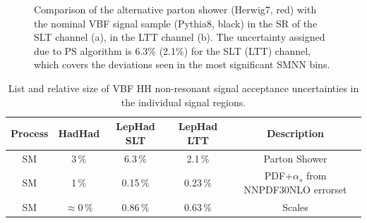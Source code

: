 \begin{figure}[htbp]
  \centering


  \caption{Comparison of the alternative parton shower (Herwig7, red)
    with the nominal VBF signal sample (Pythia8, black) in the SR of
    the \lephad SLT channel (a), in the LTT channel (b). The uncertainty assigned due to PS algorithm is
    6.3\% (2.1\%) for the SLT (LTT) channel, which covers the deviations seen in
    the most significant SMNN bins.}
\label{fig:lephad_vbf_ps}
\end{figure}



\begin{table}
\centering
\small
\begin{tabular}{|c|c|c|c|c|}
\hline
Process & HadHad & LepHad SLT & LepHad LTT & Description\\
\hline
SM  & 3\,\% & 6.3\,\% & 2.1\,\% & Parton Shower\\
SM & 1\,\% &  0.15\,\% &  0.23\,\% & PDF+$\alpha_s$ from NNPDF30NLO errorset\\
SM & $\approx 0\,\%$ &  0.86\,\% &  0.63\,\% & Scales \\
\hline
\end{tabular}
\caption{List and relative size of VBF HH non-resonant signal acceptance uncertainties in the individual signal regions.}
\label{sec:systs:tab:systematics_HHNonResSignalVBF_AcceptanceNumbers}
\end{table}

